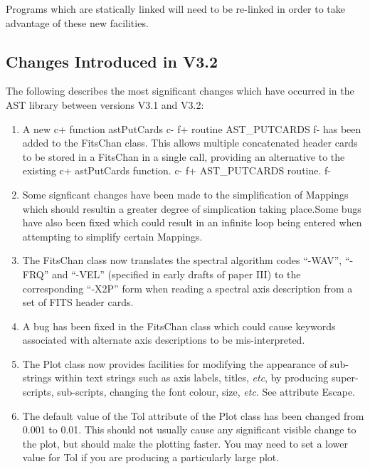 \documentclass[twoside,11pt]{starlink}
\begin{document}
Programs which are statically linked will need to be re-linked in
order to take advantage of these new facilities.


\subsection{Changes Introduced in V3.2}

The following describes the most significant changes which have
occurred in the AST library between versions V3.1 and V3.2:

\begin{enumerate}

\item A new
c+
function astPutCards
c-
f+
routine AST\_PUTCARDS
f-
has been added to the FitsChan class. This allows multiple concatenated header
cards to be stored in a FitsChan in a single call, providing an alternative to
the existing
c+
astPutCards function.
c-
f+
AST\_PUTCARDS routine.
f-

\item Some signficant changes have been made to the simplification of Mappings
 which should resultin a greater degree of simplication taking place.Some
 bugs have also been fixed which could result in an infinite loop being
 entered when attempting to simplify certain Mappings.

\item The FitsChan class now translates the spectral algorithm codes
``-WAV'', ``-FRQ'' and ``-VEL'' (specified in early drafts of paper III) to
the corresponding ``-X2P'' form when reading a spectral axis description
from a set of FITS header cards.

\item A bug has been fixed in the FitsChan class which could cause
keywords associated with alternate axis descriptions to be mis-interpreted.

\item The Plot class now provides facilities for modifying the appearance
of sub-strings within text strings such as axis labels, titles, \emph{etc},
by producing super-scripts, sub-scripts, changing the font colour, size,
\emph{etc}. See attribute Escape.

\item The default value of the Tol attribute of the Plot class has been
changed from 0.001 to 0.01. This should not usually cause any significant
visible change to the plot, but should make the plotting faster. You may
need to set a lower value for Tol if you are producing a particularly
large plot.


\end{enumerate}
\end{document}
